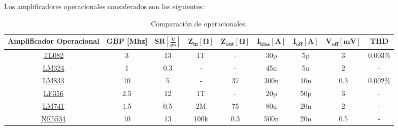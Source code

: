 Los amplificadores operacionales considerados son los siguientes:
\begin{table}[H]
\hspace*{-0.5cm}
\begin{tabular}{ccccccccc}
\hline
\textbf{Amplificador Operacional} & \textbf{GBP [Mhz]} & $\mathbf{SR [\frac{V}{\mu s}]}$ & $\mathbf{Z_{in} [\Omega]}$ & $\mathbf{Z_{out}[\Omega]}$ & $\mathbf{I_{bias}[A]}$ & $\mathbf{I_{off}[A]}$ & $\mathbf{V_{off}[mV]}$ & \textbf{THD} \\ \hline
\href{http://www.ti.com/lit/ds/symlink/tl082-n.pdf}{TL082}                   & 3                  & 13                              & 1T                         & -                          & 30p                 & 5p                    & 3                      & 0.003$\%$    \\
\href{http://www.ti.com/lit/ds/symlink/lm324-n.pdf}{LM324}                    & 1                  & 0.3                             & -                          & -                          & 45n                  & 5n                     & 2                      & -            \\
\href{http://www.ti.com/lit/ds/symlink/lm833.pdf}{LM833}                    & 10                 & 5                               & -                          & 37                         & 300n                & 10n                   & 0.3                    & 0.002$\%$    \\
\href{http://www.ti.com/lit/ds/symlink/lf356-mil.pdf}{LF356}                    & 2.5                & 12                              & 1T                         & -                          & 20p                 & 50p                   & 3                      & -            \\
\href{http://www.ti.com/lit/ds/symlink/lm741.pdf}{LM741}                    & 1.5                & 0.5                             & 2M                         & 75                         & 80n                 & 20n                   & 2                      & -            \\
\href{http://www.ti.com/lit/ds/slos070d/slos070d.pdf}{NE5534}                   & 10                 & 13                              & 100k                       & 0.3                        & 500n                & 20n                   & 0.5                    & -           \\
\hline
\end{tabular}
\caption{Comparación de operacionales.}
\end{table}

